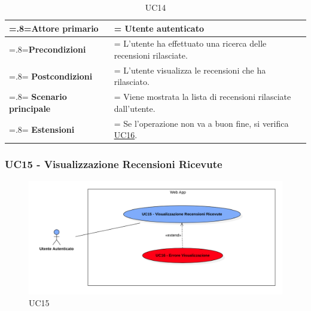             \begin{table}[H]
                \centering
                \renewcommand{\arraystretch}{1.8}
                \renewcommand\tabularxcolumn[1]{m{#1}}
                \begin{tabularx}{0.9\textwidth} {
                    >{\hsize=.8\hsize\linewidth=\hsize}X
                    >{\hsize=1.2\hsize\linewidth=\hsize}X}
                    \hline
                    \textbf{Attore primario} & Utente autenticato \\
                    \hline
                    \textbf{Precondizioni} & L'utente ha effettuato una ricerca delle recensioni rilasciate. \\
                    \hline
                    \textbf{Postcondizioni} & L'utente visualizza le recensioni che ha rilasciato. \\
                    \hline
                    \textbf{Scenario principale} & Viene mostrata la lista di recensioni rilasciate dall'utente. \\
                    \hline
                    \textbf{Estensioni} & Se l'operazione non va a buon fine, si verifica \hyperref[UC16]{UC16}. \\
                    \hline
                \end{tabularx}
                \caption{UC14}
            \end{table}

        \subsubsection{UC15 - Visualizzazione Recensioni Ricevute}
        \label{UC15}

            \begin{figure}[H]
                \centering
                \includegraphics[scale=0.4]{src/img/UC15.png}
                \caption{UC15}
            \end{figure}

